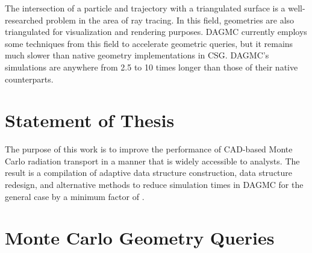 The intersection of a particle and trajectory with a triangulated surface is a
well-researched problem in the area of ray tracing. In this field, geometries
are also triangulated for visualization and rendering purposes. DAGMC currently
employs some techniques from this field to accelerate geometric queries, but it
remains much slower than native geometry implementations in CSG. DAGMC's
simulations are anywhere from 2.5 to 10 times longer than those of their native
counterparts.

\section{Statement of Thesis}

The purpose of this work is to improve the performance of CAD-based Monte Carlo
radiation transport in a manner that is widely accessible to analysts. The
result is a compilation of adaptive data structure construction, data structure
redesign, and alternative methods to reduce simulation times in DAGMC for the
general case by a minimum factor of .


\section{Monte Carlo Geometry Queries}

